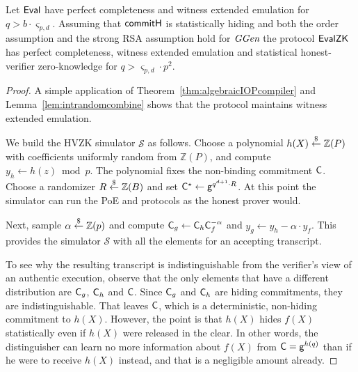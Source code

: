 \begin{theorem}
Let $\textsf{{Eval}}$ have perfect completeness and witness extended emulation for $q> b\cdot \boldsymbol{\varsigma}_{p, d}$. Assuming that $\textsf{{commitH}}$ is statistically hiding and both the order assumption and the strong RSA assumption hold for $\textit{GGen}$ the protocol $\textsf{{EvalZK}}$ has perfect completeness, witness extended emulation and statistical honest-verifier zero-knowledge for $q>\boldsymbol{\varsigma}_{p, d} \cdot p^2$.
\end{theorem}

\begin{proof}
A simple application of Theorem~\ref{thm:algebraicIOPcompiler} and Lemma~\ref{lem:intrandomcombine} shows that the protocol maintains witness extended emulation.   

We build the HVZK simulator $\mathcal{S}$ as follows. Choose a polynomial $h(X) \overset{\$}{\gets} \mathbb{Z}(P)$ with coefficients uniformly random from $\mathbb{Z}(P)$, and compute $y_h \gets h(z) \bmod p$. The polynomial fixes the non-binding commitment $\mathsf{C}$. Choose a randomizer $R \overset{\$}{\gets} \mathbb{Z}(B)$ and set $\mathsf{C}^\star \gets \mathsf{g}^{q^{d+1} \cdot R}$. At this point the simulator can run the \textsf{PoE} and \eval protocols as the honest prover would.

Next, sample $\alpha \overset{\$}{\gets} \mathbb{Z}(p)$ and compute $\mathsf{C}_g \gets \mathsf{C}_h \mathsf{C}_f^{-\alpha}$ and $y_g \gets y_h - \alpha \cdot y_f$. This provides the simulator $\mathcal{S}$ with all the elements for an accepting transcript.

To see why the resulting transcript is indistinguishable from the verifier's view of an authentic execution, observe that the only elements that have a different distribution are $\mathsf{C}_g$, $\mathsf{C}_h$ and $\mathsf{C}$. Since $\mathsf{C}_g$ and $\mathsf{C}_h$ are hiding commitments, they are indistinguishable. That leaves $\mathsf{C}$, which is a deterministic, non-hiding commitment to $h(X)$. However, the point is that $h(X)$ hides $f(X)$ statistically even if $h(X)$ were released in the clear. In other words, the distinguisher can learn no more information about $f(X)$ from $\mathsf{C} = \mathsf{g}^{h(q)}$ than if he were to receive $h(X)$ instead, and that is a negligible amount already.
\end{proof}
